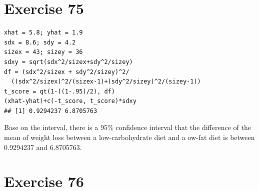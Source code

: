 \documentclass{article}\usepackage[]{graphicx}\usepackage[]{color}
\makeatletter
\newenvironment{kframe}{%
 \def\at@end@of@kframe{}%
 \ifinner\ifhmode%
  \def\at@end@of@kframe{\end{minipage}}%
  \begin{minipage}{\columnwidth}%
 \fi\fi%
 \def\FrameCommand##1{\hskip\@totalleftmargin \hskip-\fboxsep
 \colorbox{shadecolor}{##1}\hskip-\fboxsep
     \hskip-\linewidth \hskip-\@totalleftmargin \hskip\columnwidth}%
 \MakeFramed {\advance\hsize-\width
   \@totalleftmargin\z@ \linewidth\hsize
   \@setminipage}}%
 {\par\unskip\endMakeFramed%
 \at@end@of@kframe}
\newenvironment{knitrout}{}{} %
\makeatother
\begin{document}
\section*{Exercise 75}
\begin{knitrout}
\color{fgcolor}\begin{kframe}
\begin{verbatim}
xhat = 5.8; yhat = 1.9 
sdx = 8.6; sdy = 4.2
sizex = 43; sizey = 36
sdxy = sqrt(sdx^2/sizex+sdy^2/sizey)
df = (sdx^2/sizex + sdy^2/sizey)^2/
  ((sdx^2/sizex)^2/(sizex-1)+(sdy^2/sizey)^2/(sizey-1))
t_score = qt(1-((1-.95)/2), df)
(xhat-yhat)+c(-t_score, t_score)*sdxy  
## [1] 0.9294237 6.8705763
\end{verbatim}
\end{kframe}
\end{knitrout}
Base on the interval, there is a 95\% confidence interval that the difference of the mean of weight loss between a low-carbohydrate diet and a ow-fat diet is between 0.9294237 and 6.8705763.
\section*{Exercise 76}
\end{document}
